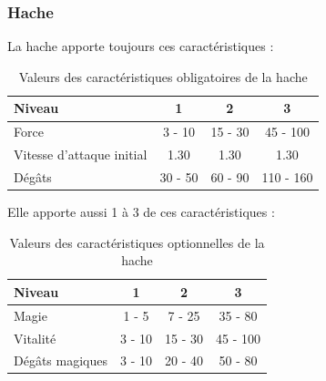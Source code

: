 \documentclass[11pt, a4paper, oneside]{report}
\begin{document}
\subsubsection{Hache}
La hache apporte toujours ces caractéristiques :
\begin{table}[H]
\begin{center}
\begin{tabular}{| l | c | c | c |}
  \hline      
  Niveau 				& 1 & 2 & 3\\ \hline \hline                 
  Force 				& 3 - 10 & 15 - 30 & 45 - 100\\ \hline
  Vitesse d'attaque initial	& 1.30 & 1.30 & 1.30\\ \hline
  Dégâts 				& 30 - 50 & 60 - 90 & 110 - 160\\ \hline
\end{tabular}
\caption{Valeurs des caractéristiques obligatoires de la hache}
\end{center}
\end{table}
Elle apporte aussi 1 à 3 de ces caractéristiques :
\begin{table}[H]
\begin{center}
\begin{tabular}{| l | c | c | c |}
  \hline      
  Niveau 				& 1 & 2 & 3\\ \hline \hline
  Magie 				& 1 - 5 & 7 - 25 & 35 - 80\\ \hline
  Vitalité 				& 3 - 10 & 15 - 30 & 45 - 100\\ \hline
  Dégâts magiques 		& 3 - 10 & 20 - 40 & 50 - 80\\ \hline
\end{tabular}
\caption{Valeurs des caractéristiques optionnelles de la hache}
\end{center}
\end{table}
\end{document}
